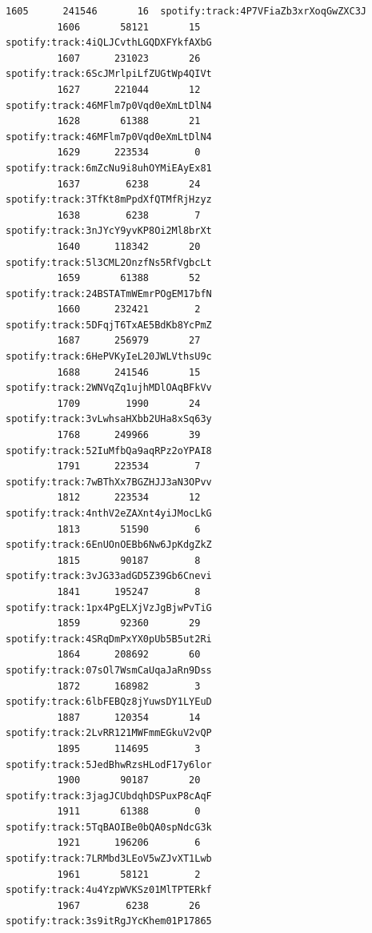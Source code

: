 \documentclass[11pt]{article}
\begin{document}
\begin{Verbatim}[commandchars=\\\{\}]
         1605      241546       16  spotify:track:4P7VFiaZb3xrXoqGwZXC3J   
         1606       58121       15  spotify:track:4iQLJCvthLGQDXFYkfAXbG   
         1607      231023       26  spotify:track:6ScJMrlpiLfZUGtWp4QIVt   
         1627      221044       12  spotify:track:46MFlm7p0Vqd0eXmLtDlN4   
         1628       61388       21  spotify:track:46MFlm7p0Vqd0eXmLtDlN4   
         1629      223534        0  spotify:track:6mZcNu9i8uhOYMiEAyEx81   
         1637        6238       24  spotify:track:3TfKt8mPpdXfQTMfRjHzyz   
         1638        6238        7  spotify:track:3nJYcY9yvKP8Oi2Ml8brXt   
         1640      118342       20  spotify:track:5l3CML2OnzfNs5RfVgbcLt   
         1659       61388       52  spotify:track:24BSTATmWEmrPOgEM17bfN   
         1660      232421        2  spotify:track:5DFqjT6TxAE5BdKb8YcPmZ   
         1687      256979       27  spotify:track:6HePVKyIeL20JWLVthsU9c   
         1688      241546       15  spotify:track:2WNVqZq1ujhMDlOAqBFkVv   
         1709        1990       24  spotify:track:3vLwhsaHXbb2UHa8xSq63y   
         1768      249966       39  spotify:track:52IuMfbQa9aqRPz2oYPAI8   
         1791      223534        7  spotify:track:7wBThXx7BGZHJJ3aN3OPvv   
         1812      223534       12  spotify:track:4nthV2eZAXnt4yiJMocLkG   
         1813       51590        6  spotify:track:6EnUOnOEBb6Nw6JpKdgZkZ   
         1815       90187        8  spotify:track:3vJG33adGD5Z39Gb6Cnevi   
         1841      195247        8  spotify:track:1px4PgELXjVzJgBjwPvTiG   
         1859       92360       29  spotify:track:4SRqDmPxYX0pUb5B5ut2Ri   
         1864      208692       60  spotify:track:07sOl7WsmCaUqaJaRn9Dss   
         1872      168982        3  spotify:track:6lbFEBQz8jYuwsDY1LYEuD   
         1887      120354       14  spotify:track:2LvRR121MWFmmEGkuV2vQP   
         1895      114695        3  spotify:track:5JedBhwRzsHLodF17y6lor   
         1900       90187       20  spotify:track:3jagJCUbdqhDSPuxP8cAqF   
         1911       61388        0  spotify:track:5TqBAOIBe0bQA0spNdcG3k   
         1921      196206        6  spotify:track:7LRMbd3LEoV5wZJvXT1Lwb   
         1961       58121        2  spotify:track:4u4YzpWVKSz01MlTPTERkf   
         1967        6238       26  spotify:track:3s9itRgJYcKhem01P17865   
         

\end{Verbatim}
\end{document}
